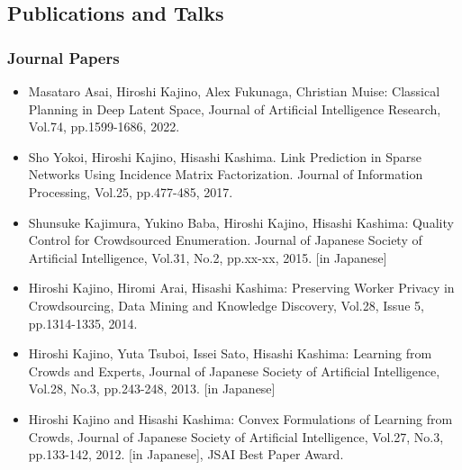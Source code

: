 \documentclass[a4paper,9pt]{article}
\begin{document}
\subsection*{Publications and Talks}


\subsubsection*{Journal Papers}
\begin{itemize}
 \item Masataro Asai, Hiroshi Kajino, Alex Fukunaga, Christian Muise: Classical Planning in Deep Latent Space, Journal of Artificial Intelligence Research, Vol.74, pp.1599-1686, 2022.
 \item Sho Yokoi, Hiroshi Kajino, Hisashi Kashima. Link Prediction in Sparse Networks Using Incidence Matrix Factorization. Journal of Information Processing, Vol.25, pp.477-485, 2017. 
 \item Shunsuke Kajimura, Yukino Baba, Hiroshi Kajino, Hisashi Kashima: Quality Control for Crowdsourced Enumeration. Journal of Japanese Society of Artificial Intelligence, Vol.31, No.2, pp.xx-xx, 2015. [in Japanese]
 \item Hiroshi Kajino, Hiromi Arai, Hisashi Kashima: Preserving Worker Privacy in Crowdsourcing, Data Mining and Knowledge Discovery, Vol.28, Issue 5, pp.1314-1335, 2014.
 \item Hiroshi Kajino, Yuta Tsuboi, Issei Sato, Hisashi Kashima: Learning from Crowds and Experts, Journal of Japanese Society of Artificial Intelligence, Vol.28, No.3, pp.243-248, 2013. [in Japanese]
 \item Hiroshi Kajino and Hisashi Kashima: Convex Formulations of Learning from Crowds, Journal of Japanese Society of Artificial Intelligence, Vol.27, No.3, pp.133-142, 2012. [in Japanese], {JSAI Best Paper Award}.
\end{itemize}
\end{document}
